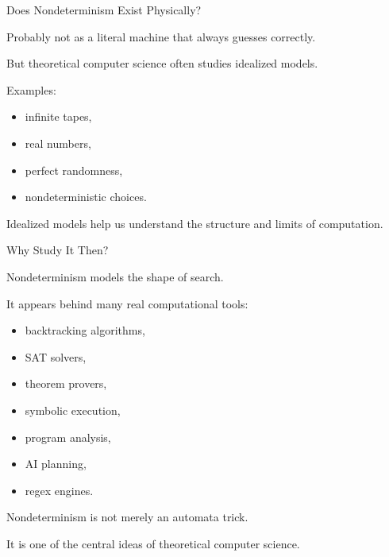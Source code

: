 \documentclass[10pt,aspectratio=169]{beamer}
\begin{document}
\begin{frame}{Does Nondeterminism Exist Physically?}

Probably not as a literal machine that always guesses correctly.

\vspace{1em}

But theoretical computer science often studies idealized models.

\vspace{0.5em}

Examples:

\begin{itemize}
\item infinite tapes,
\item real numbers,
\item perfect randomness,
\item nondeterministic choices.
\end{itemize}

\vspace{0.5em}

\pause
Idealized models help us understand the structure and limits of computation.

\end{frame}

\begin{frame}{Why Study It Then?}

Nondeterminism models the shape of search.

\vspace{1em}

It appears behind many real computational tools:

\begin{itemize}
\item backtracking algorithms,
\item SAT solvers,
\item theorem provers,
\item symbolic execution,
\item program analysis,
\item AI planning,
\item regex engines.
\end{itemize}

\end{frame}

\begin{frame}[standout]
Nondeterminism is not merely an automata trick.

It is one of the central ideas of theoretical computer science.
\end{frame}
\end{document}
